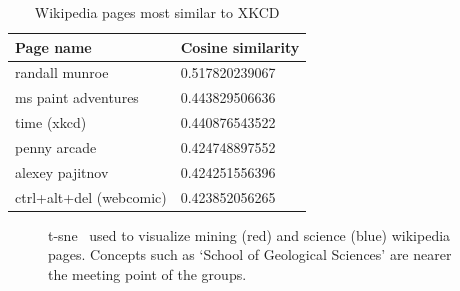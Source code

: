 \documentclass[11pt]{article}
\begin{document}
  \begin{table}[h]
    \begin{center}
      \begin{tabular}{l l}
        Page name & Cosine similarity\\
        \hline
        randall munroe & 0.517820239067\\
        ms paint adventures & 0.443829506636\\
        time (xkcd)  & 0.440876543522\\
        penny arcade & 0.424748897552\\
        alexey pajitnov & 0.424251556396\\
        ctrl+alt+del (webcomic)  & 0.423852056265\\
      \end{tabular}
    \caption{Wikipedia pages most similar to XKCD}
    \label{tab:xkcd}
    \end{center}
  \end{table}

  \begin{figure}[h]
    \begin{center}
    \end{center}
    \caption{t-sne~\cite{maaten2008visualizing} used to visualize
             mining (red) and science (blue) wikipedia pages.
             Concepts such as `School of Geological Sciences' are nearer
             the meeting point of the groups.}
    \label{fig:mvs}
  \end{figure}
\end{document}
